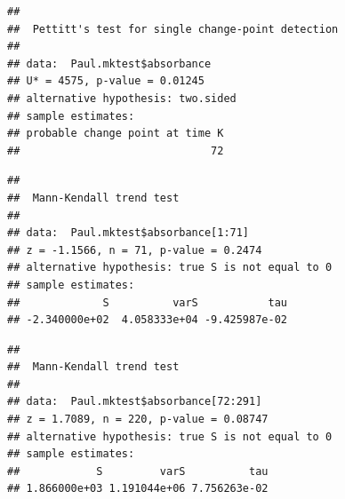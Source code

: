 \documentclass[12pt,]{article}
\newenvironment{Shaded}{\begin{snugshade}}{\end{snugshade}}
\newcommand{\KeywordTok}[1]{\textcolor[rgb]{0.13,0.29,0.53}{\textbf{#1}}}
\newcommand{\DecValTok}[1]{\textcolor[rgb]{0.00,0.00,0.81}{#1}}
\newcommand{\CommentTok}[1]{\textcolor[rgb]{0.56,0.35,0.01}{\textit{#1}}}
\newcommand{\OperatorTok}[1]{\textcolor[rgb]{0.81,0.36,0.00}{\textbf{#1}}}
\newcommand{\NormalTok}[1]{#1}
\begin{document}
\begin{Shaded}
\end{Shaded}

\begin{verbatim}
## 
##  Pettitt's test for single change-point detection
## 
## data:  Paul.mktest$absorbance
## U* = 4575, p-value = 0.01245
## alternative hypothesis: two.sided
## sample estimates:
## probable change point at time K 
##                              72
\end{verbatim}

\begin{Shaded}
\end{Shaded}

\begin{verbatim}
## 
##  Mann-Kendall trend test
## 
## data:  Paul.mktest$absorbance[1:71]
## z = -1.1566, n = 71, p-value = 0.2474
## alternative hypothesis: true S is not equal to 0
## sample estimates:
##             S          varS           tau 
## -2.340000e+02  4.058333e+04 -9.425987e-02
\end{verbatim}

\begin{Shaded}
\end{Shaded}

\begin{verbatim}
## 
##  Mann-Kendall trend test
## 
## data:  Paul.mktest$absorbance[72:291]
## z = 1.7089, n = 220, p-value = 0.08747
## alternative hypothesis: true S is not equal to 0
## sample estimates:
##            S         varS          tau 
## 1.866000e+03 1.191044e+06 7.756263e-02
\end{verbatim}
\end{document}
